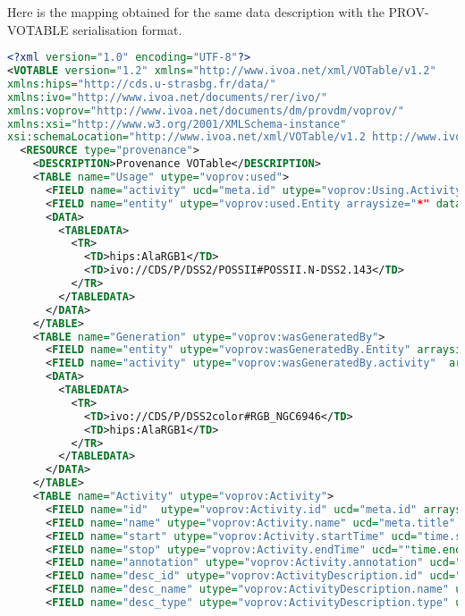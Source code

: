 Here is the mapping obtained for the same data description with the PROV-VOTABLE serialisation format.

\begin{lstlisting}[language=XML, caption= PROV-VOTABLE serialisation example for a color composition activity]
<?xml version="1.0" encoding="UTF-8"?>
<VOTABLE version="1.2" xmlns="http://www.ivoa.net/xml/VOTable/v1.2" 
xmlns:hips="http://cds.u-strasbg.fr/data/" 
xmlns:ivo="http://www.ivoa.net/documents/rer/ivo/" 
xmlns:voprov="http://www.ivoa.net/documents/dm/provdm/voprov/" 
xmlns:xsi="http://www.w3.org/2001/XMLSchema-instance" 
xsi:schemaLocation="http://www.ivoa.net/xml/VOTable/v1.2 http://www.ivoa.net/xml/VOTable/VOTable-1.2.xsd">
  <RESOURCE type="provenance">
    <DESCRIPTION>Provenance VOTable</DESCRIPTION>
    <TABLE name="Usage" utype="voprov:used">
      <FIELD name="activity" ucd="meta.id" utype="voprov:Using.Activity"arraysize="*" datatype="char" />
      <FIELD name="entity" utype="voprov:used.Entity arraysize="*" datatype="char"  ucd="meta.id" "/>
      <DATA>
        <TABLEDATA>
          <TR>
            <TD>hips:AlaRGB1</TD>
            <TD>ivo://CDS/P/DSS2/POSSII#POSSII.N-DSS2.143</TD>
          </TR>
        </TABLEDATA>
      </DATA>
    </TABLE>
    <TABLE name="Generation" utype="voprov:wasGeneratedBy">
      <FIELD name="entity" utype="voprov:wasGeneratedBy.Entity" arraysize="*" datatype="char"  ucd="meta.id"/>
      <FIELD name="activity" utype="voprov:wasGeneratedBy.activity"  arraysize="*" datatype="char"  ucd="meta.id"/>
      <DATA>
        <TABLEDATA>
          <TR>
            <TD>ivo://CDS/P/DSS2color#RGB_NGC6946</TD>
            <TD>hips:AlaRGB1</TD>
          </TR>
        </TABLEDATA>
      </DATA>
    </TABLE>
    <TABLE name="Activity" utype="voprov:Activity">
      <FIELD name="id"  utype="voprov:Activity.id" ucd="meta.id" arraysize="*" datatype="char" />
      <FIELD name="name" utype="voprov:Activity.name" ucd="meta.title" arraysize="*" datatype="char" />
      <FIELD name="start" utype="voprov:Activity.startTime" ucd="time.start" arraysize="*" datatype="char" />
      <FIELD name="stop" utype="voprov:Activity.endTime" ucd=""time.end" arraysize="*" datatype="char"  "/>
      <FIELD name="annotation" utype="voprov:Activity.annotation" ucd="meta.description" arraysize="*" datatype="char" />
      <FIELD name="desc_id" utype="voprov:ActivityDescription.id" ucd="meta.id" arraysize="*" datatype="char" />
      <FIELD name="desc_name" utype="voprov:ActivityDescription.name" ucd="meta.title" arraysize="*" datatype="char" />
      <FIELD name="desc_type" utype="voprov:ActivityDescription.type" ucd="meta.code.class" arraysize="*" datatype="char" />

\end{lstlisting}
